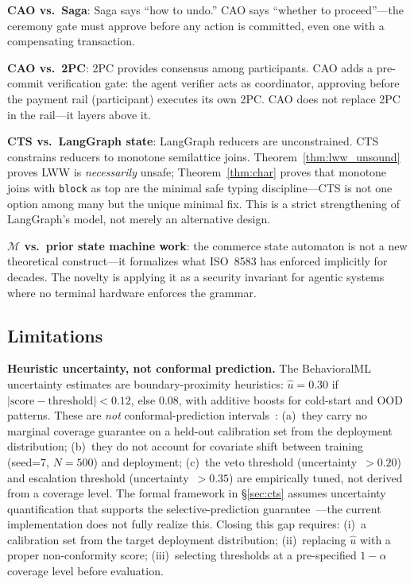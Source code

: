 \documentclass{article}
\begin{document}
\textbf{CAO vs.\ Saga}: Saga says ``how to undo.'' CAO says ``whether to proceed''---the ceremony gate must approve before any action is committed, even one with a compensating transaction.

\textbf{CAO vs.\ 2PC}: 2PC provides consensus among participants. CAO adds a pre-commit verification gate: the agent verifier acts as coordinator, approving before the payment rail (participant) executes its own 2PC. CAO does not replace 2PC in the rail---it layers above it.

\textbf{CTS vs.\ LangGraph state}: LangGraph reducers are unconstrained. CTS constrains reducers to monotone semilattice joins. Theorem~\ref{thm:lww_unsound} proves LWW is \emph{necessarily} unsafe; Theorem~\ref{thm:char} proves that monotone joins with \texttt{block} as top are the minimal safe typing discipline---CTS is not one option among many but the unique minimal fix. This is a strict strengthening of LangGraph's model, not merely an alternative design.

\textbf{$\mathcal{M}$ vs.\ prior state machine work}: the commerce state automaton is not a new theoretical construct---it formalizes what ISO~8583 has enforced implicitly for decades. The novelty is applying it as a security invariant for agentic systems where no terminal hardware enforces the grammar.

\subsection{Limitations}
\label{sec:discussion_limits}

\textbf{Heuristic uncertainty, not conformal prediction.} The BehavioralML uncertainty estimates are boundary-proximity heuristics: $\hat{u} = 0.30$ if $|\text{score} - \text{threshold}| < 0.12$, else $0.08$, with additive boosts for cold-start and OOD patterns. These are \emph{not} conformal-prediction intervals~\cite{conformal}: (a)~they carry no marginal coverage guarantee on a held-out calibration set from the deployment distribution; (b)~they do not account for covariate shift between training (seed=7, $N=500$) and deployment; (c)~the veto threshold (uncertainty~$> 0.20$) and escalation threshold (uncertainty~$> 0.35$) are empirically tuned, not derived from a coverage level. The formal framework in \S\ref{sec:cts} assumes uncertainty quantification that supports the selective-prediction guarantee~\cite{selective}---the current implementation does not fully realize this. Closing this gap requires: (i)~a calibration set from the target deployment distribution; (ii)~replacing $\hat{u}$ with a proper non-conformity score; (iii)~selecting thresholds at a pre-specified $1-\alpha$ coverage level before evaluation.
\end{document}
